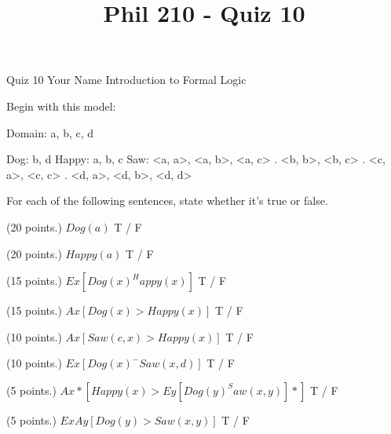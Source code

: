 
\title{Phil 210 - Quiz 10}

\heading
Quiz 10
Your Name
Introduction to Formal Logic
\endheading

Begin with this model:

\answer
        \firstordermodel 
        Domain: a, b, c, d

        Dog:    b, d
        Happy:  a, b, c
        Saw:    <a, a>, <a, b>, <a, c>
           .    <b, b>, <b, c>
           .    <c, a>, <c, c>
           .    <d, a>, <d, b>, <d, d>
        \endfirstordermodel
\endanswer\bigskip

For each of the following sentences, state whether it's true or false.

\quantifiers
\problems
{} (20 points.)
$ Dog(a) $
        \answer
         T / F
        \endanswer

 (20 points.)
$ Happy(a) $
        \answer
         T / F
        \endanswer

 (15 points.)
$ Ex[Dog(x) ^ Happy(x)]$
        \answer
         T / F
        \endanswer

 (15 points.)
$ Ax[Dog(x) > Happy(x)] $
        \answer
         T / F
        \endanswer

 (10 points.)
$ Ax[Saw(c,x) > Happy(x)] $
        \answer
         T / F
        \endanswer

 (10 points.)
$ Ex[Dog(x) ^ - Saw(x,d)] $
        \answer
         T / F
        \endanswer

 (5 points.)
$ Ax*[Happy(x) > Ey[Dog(y) ^ Saw(x,y)]*] $
        \answer
         T / F
        \endanswer

 (5 points.)
$ ExAy[Dog(y) > Saw(x,y)] $
        \answer
         T / F
        \endanswer

\endproblems
\bye

